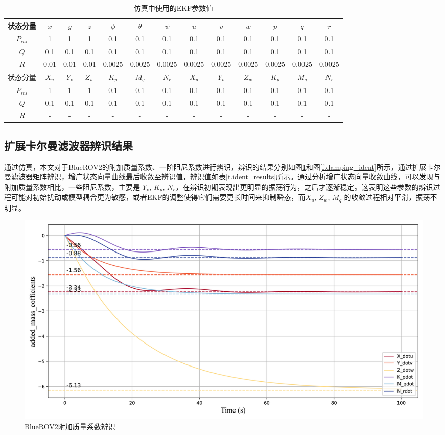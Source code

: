 \begin{table}[htb]
  \centering
  \caption{仿真中使用的EKF参数值}
  \label{t.PID_params}
  \begin{tabular}{ccccccccccccc}
  \hline
状态分量 & $x$ & $y$ & $z$ & $\phi$ & $\theta$ & $\psi$ & $u$ & $v$ & $w$ & $p$ & $q$ & $r$ \\
\hline
$P_{ini}$ & 1 & 1 & 1 & 0.1 & 0.1 & 0.1 & 0.1 & 0.1 & 0.1 & 0.1 & 0.1 & 0.1  \\
$Q$ & 0.1 & 0.1 & 0.1 & 0.1 & 0.1 & 0.1 & 0.1 & 0.1 & 0.1 & 0.1 & 0.1 & 0.1  \\
$R$ & 0.01 & 0.01 & 0.01 & 0.0025 & 0.0025 & 0.0025 & 0.0025 & 0.0025 & 0.0025 & 0.0025 & 0.0025 & 0.0025 \\
\hline
\hline
状态分量 & $X_u$ & $Y_v$ & $Z_w$ & $K_p$ & $M_q$ & $N_r$ & $X_{\dot{u}}$ & $Y_{\dot{v}}$ & $Z_{\dot{w}}$ & $K_{\dot{p}}$ & $M_{\dot{q}}$ & $N_{\dot{r}}$ \\
\hline
$P_{ini}$ & 1 & 1 & 1 & 0.1 & 0.1 & 0.1 & 0.1 & 0.1 & 0.1 & 0.1 & 0.1 & 0.1  \\
$Q$ & 0.1 & 0.1 & 0.1 & 0.1 & 0.1 & 0.1 & 0.1 & 0.1 & 0.1 & 0.1 & 0.1 & 0.1  \\
$R$ & - & - & - & - & - & - & - & - & - & - & - & - \\
\hline
\end{tabular}
\end{table}

\subsection{扩展卡尔曼滤波器辨识结果}

通过仿真，本文对于BlueROV2的附加质量系数、一阶阻尼系数进行辨识，辨识的结果分别如图\ref{f.added_mass_ident}和图\ref{f.damping_ident}所示，通过扩展卡尔曼滤波器矩阵辨识，增广状态向量曲线最后收敛至辨识值，辨识值如表\ref{t.ident_results}所示。通过分析增广状态向量收敛曲线，可以发现与附加质量系数相比，一些阻尼系数，主要是 $Y_v$, $K_p$, $N_r$，在辨识初期表现出更明显的振荡行为，之后才逐渐稳定。这表明这些参数的辨识过程可能对初始扰动或模型耦合更为敏感，或者EKF的调整使得它们需要更长时间来抑制瞬态，而$X_u$, $Z_w$, $M_q$ 的收敛过程相对平滑，振荡不明显。

\begin{figure}[hbt]
    \centering
    \includegraphics[width=0.8\linewidth]{images/chapter3/附加质量辨识结果.png}
    \caption{BlueROV2附加质量系数辨识}
    \label{f.added_mass_ident}
\end{figure}


